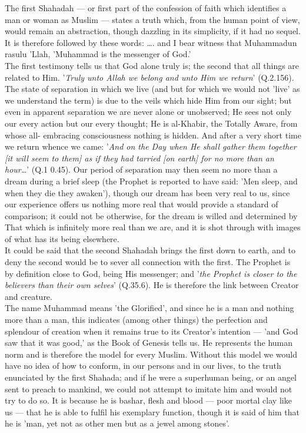 \documentclass[10pt, twoside]{book}
\begin{document}
The first Shahadah --- or first part of the confession of faith which identifies a man or woman as 
Muslim --- states a truth which, from the human point of view, would remain an abstraction, though 
dazzling in its simplicity, if it had no sequel. It is therefore followed by these words: \ldots{}. and I 
bear witness that Muhammadun rasulu 'Llah, 'Muhammad is the messenger of God.' \\

The first testimony tells us that God alone truly is; the second that all things are related to Him. 
'\emph{Truly unto Allah we belong and unto Him we return}' (Q.2.156). The state of separation in which we live (and but for which we would not 'live' as we understand the term) is due to the veils which hide 
Him from our sight; but even in apparent separation we are never alone or unobserved; He sees not 
only our every action but our every thought; He is al\hyp{}Khabir, the Totally Aware, from whose all\hyp{}
embracing consciousness nothing is hidden. And after a very short time we return whence we came: '\emph{And on the Day when He shall gather them together [it will seem to them] as if they had tarried [on earth] for no more than an hour\ldots{}}' (Q.1 0.45). Our period of separation may then seem no more than a dream during a brief sleep (the Prophet is reported to have said: 'Men sleep, and when they die they awaken'), though our dream has been very real to us, since our experience offers us nothing more real that would provide a standard of comparison; it could not be otherwise, for the dream is willed and determined by That which is infinitely more real than we are, and it is shot through with images of 
what has its being elsewhere. \\

It could be said that the second Shahadah brings the first down to earth, and to deny the second 
would be to sever all connection with the first. The Prophet is by definition close to God, being His 
messenger; and '\emph{the Prophet is closer to the believers than their own selves}' (Q.35.6). He is 
therefore the link between Creator and creature. \\

The name Muhammad means 'the Glorified', and since he is a man and nothing more than a man, this 
indicates (among other things) the perfection and splendour of creation when it remains true to its 
Creator's intention --- 'and God saw that it was good,' as the Book of Genesis tells us. He represents 
the human norm and is therefore the model for every Muslim. Without this model we would have no idea 
of how to conform, in our persons and in our lives, to the truth enunciated by the first Shahada; 
and if he were a superhuman being, or an angel sent to preach to mankind, we could not attempt to 
imitate him and would not try to do so. It is because he is bashar, flesh and blood --- poor mortal 
clay like us --- that he is able to fulfil his exemplary function, though it is said of him that he is 
'man, yet not as other men but as a jewel among stones'. \\
\end{document}
